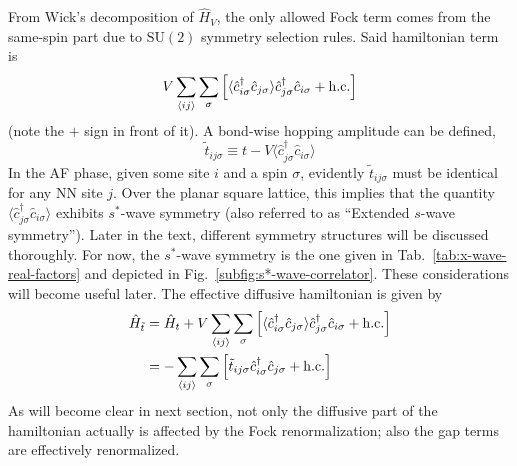 From Wick's decomposition of $\hat H_V$, the only allowed Fock term comes from the same-spin part due to $\mathrm{SU}(2)$ symmetry selection rules. Said hamiltonian term is
\begin{equation}\label{eq:real-space-non-local-interaction-fock}
	V \sum_{\ev{ij}} \sum_\sigma \left[
		\langle
			\hat c_{i\sigma}^\dagger \hat c_{j\sigma}
		\rangle \hat c_{j\sigma}^\dagger  \hat c_{i\sigma} + \mathrm{h.c.}
	\right]
\end{equation}
(note the $+$ sign in front of it). A bond-wise hopping amplitude can be defined,
\[
	\tilde{t}_{ij\sigma} \equiv t - V \langle
		\hat c_{j\sigma}^\dagger \hat c_{i\sigma}
	\rangle
\]
In the AF phase, given some site $i$ and a spin $\sigma$, evidently $\tilde{t}_{ij\sigma}$ must be identical for any NN site $j$. Over the planar square lattice, this implies that the quantity $\langle
\hat c_{j\sigma}^\dagger \hat c_{i\sigma} \rangle$ exhibits $s^*$-wave symmetry (also referred to as ``Extended $s$-wave symmetry''). Later in the text, different symmetry structures will be discussed thoroughly. For now, the $s^*$-wave symmetry is the one given in Tab.~\ref{tab:x-wave-real-factors} and depicted in Fig.~\ref{subfig:s*-wave-correlator}. These considerations will become useful later. The effective diffusive hamiltonian is given by
\[
\begin{aligned}
	\hat H_{\tilde{t}} &= \hat H_t + V \sum_{\ev{ij}} \sum_\sigma \left[
		\langle
			\hat c_{i\sigma}^\dagger \hat c_{j\sigma}
		\rangle \hat c_{j\sigma}^\dagger  \hat c_{i\sigma} + \mathrm{h.c.}
	\right] \\
	&= - \sum_{\ev{ij}} \sum_\sigma 
	\left[
		\tilde{t}_{ij\sigma} \hat c_{i\sigma}^\dagger \hat c_{j\sigma} + \mathrm{h.c.}
	\right]
\end{aligned}
\]
As will become clear in next section, not only the diffusive part of the hamiltonian actually is affected by the Fock renormalization; also the gap terms are effectively renormalized.

